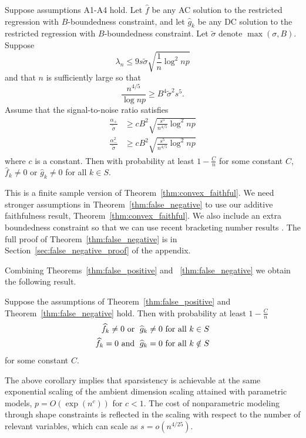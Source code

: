 \begin{theorem}
\label{thm:false_negative}
Suppose assumptions A1-A4 hold. Let $\hat{f}$ be any AC solution to
the restricted regression with $B$-boundedness constraint, and let
$\hat{g}_k$ be any DC solution to the restricted regression with
$B$-boundedness constraint. Let $\tilde{\sigma}$ denote $\max(\sigma,
B)$.  Suppose 
\begin{equation}
\lambda_n \leq 9 s \tilde{\sigma} \sqrt{\frac{1}{n} \log^2 np}
\end{equation}
and that $n$ is sufficiently large so that 
\begin{equation}
\frac{n^{4/5}}{\log np} \geq B^4 \tilde{\sigma}^2 s^5.
\end{equation}
Assume that the signal-to-noise ratio satisfies
\begin{align}
\frac{\alpha_{+}}{\tilde{\sigma}} & \geq c B^2
\sqrt{\frac{s^5}{n^{4/5}} \log^2 np}\\
\frac{\alpha_{-}^2}{\tilde{\sigma}} &\geq c B^2
\sqrt{\frac{s^5}{n^{4/5}} \log^2 np}
\end{align}
where $c$ is a constant.  Then with probability at least $1 -
\frac{C}{n}$ for some constant $C$, 
$\hat{f}_k \neq 0$ or $\hat{g}_k \neq 0$ 
for all $k \in S$.
\end{theorem}

This is a finite sample version of
Theorem~\ref{thm:convex_faithful}. We need stronger assumptions in
Theorem~\ref{thm:false_negative} to use our additive faithfulness
result, Theorem~\ref{thm:convex_faithful}. We also include an extra
boundedness constraint so that we can use recent bracketing number
results \cite{kim2014global}. The full proof of Theorem~\ref{thm:false_negative} is in Section~\ref{sec:false_negative_proof} of the appendix.

Combining Theorems~\ref{thm:false_positive} and
~\ref{thm:false_negative} 
we obtain the following result.
\begin{corollary}
  Suppose the assumptions of Theorem~\ref{thm:false_positive} and
  Theorem~\ref{thm:false_negative} hold.  
Then with probability at least $1-\frac{C}{n}$
\begin{align}
\widehat{f}_k \neq 0 \textrm{ or }\; \widehat{g}_k \neq 0 &\textrm{ for all } k \in S\\
\widehat{f}_k = 0 \textrm{ and }\; \widehat{g}_k = 0 & \textrm{ for all } k \notin S
\end{align}
for some constant $C$.

\end{corollary}
The above corollary implies that sparsistency is achievable at the
same exponential scaling of the ambient dimension scaling attained
with parametric models, $p = O(\exp(n^c))$ for $c<1$.  The cost of
nonparametric modeling through shape constraints 
is reflected in the scaling with respect to
the number of relevant variables, which can scale as $s = o(n^{4/25})$.


